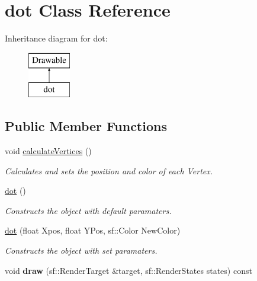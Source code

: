 \hypertarget{classdot}{}\section{dot Class Reference}
\label{classdot}
Inheritance diagram for dot\+:\begin{figure}[H]
\begin{center}
\leavevmode
\includegraphics[height=2.000000cm]{classdot}
\end{center}
\end{figure}
\subsection*{Public Member Functions}
\begin{DoxyCompactItemize}
\item 
\mbox{\label{classdot_ab7e7b07476ca33fb39c7eba358072dab}} 
void \mbox{\hyperlink{classdot_ab7e7b07476ca33fb39c7eba358072dab}{calculate\+Vertices}} ()
\begin{DoxyCompactList}\small\item\em Calculates and sets the position and color of each Vertex. \end{DoxyCompactList}\item 
\mbox{\label{classdot_a8bb8093dfad084a2aba7dcd300cd7832}} 
\mbox{\hyperlink{classdot_a8bb8093dfad084a2aba7dcd300cd7832}{dot}} ()
\begin{DoxyCompactList}\small\item\em Constructs the object with default paramaters. \end{DoxyCompactList}\item 
\mbox{\hyperlink{classdot_adafc58b4cfa749ca975280ed4367136e}{dot}} (float Xpos, float Y\+Pos, sf\+::\+Color New\+Color)
\begin{DoxyCompactList}\small\item\em Constructs the object with set paramaters. \end{DoxyCompactList}\item 
\mbox{\label{classdot_a198816651106b5ad7e853d8fcda1223d}} 
void {\bfseries draw} (sf\+::\+Render\+Target \&target, sf\+::\+Render\+States states) const
\end{DoxyCompactItemize}


